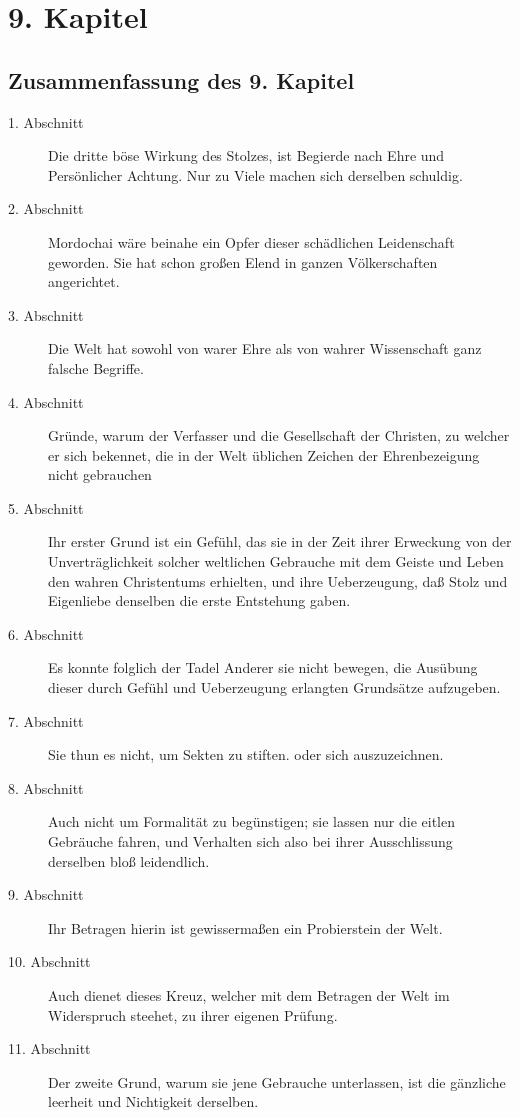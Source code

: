 
\chapter{9. Kapitel}


\section{Zusammenfassung des 9. Kapitel}
\footnotesize
\begin{description}
\item[1. Abschnitt] Die dritte böse Wirkung des Stolzes, ist Begierde nach Ehre und Persönlicher Achtung. Nur zu Viele machen sich derselben schuldig.
\item[2. Abschnitt] Mordochai wäre beinahe ein Opfer dieser schädlichen Leidenschaft geworden. Sie hat schon großen Elend in ganzen Völkerschaften angerichtet.
\item[3. Abschnitt] Die Welt hat sowohl von warer Ehre als von wahrer Wissenschaft ganz falsche Begriffe.
\item[4. Abschnitt] Gründe, warum der Verfasser und die Gesellschaft der Christen, zu welcher er sich bekennet, die in der Welt üblichen Zeichen der Ehrenbezeigung nicht gebrauchen
\item[5. Abschnitt] Ihr erster Grund ist ein Gefühl, das sie in der Zeit ihrer Erweckung von der Unverträglichkeit solcher weltlichen Gebrauche mit dem Geiste und Leben den wahren Christentums erhielten, und ihre Ueberzeugung, daß Stolz und Eigenliebe denselben die erste Entstehung gaben.
\item[6. Abschnitt] Es konnte folglich der Tadel Anderer sie nicht bewegen, die Ausübung dieser durch Gefühl und Ueberzeugung erlangten Grundsätze aufzugeben.
\item[7. Abschnitt] Sie thun es nicht, um Sekten zu stiften. oder sich auszuzeichnen.
\item[8. Abschnitt] Auch nicht um Formalität zu begünstigen; sie lassen nur die eitlen Gebräuche fahren, und Verhalten sich also bei ihrer Ausschlissung derselben bloß leidendlich.
\item[9. Abschnitt] Ihr Betragen hierin ist gewissermaßen ein Probierstein der Welt.
\item[10. Abschnitt] Auch dienet dieses Kreuz, welcher mit dem Betragen der Welt im Widerspruch steehet, zu ihrer eigenen Prüfung.
\item[11. Abschnitt] Der zweite Grund, warum sie jene Gebrauche unterlassen, ist die gänzliche leerheit und Nichtigkeit derselben.

\end{description}
